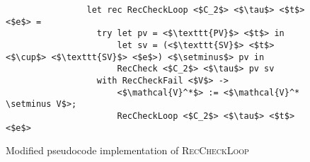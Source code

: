 \begin{figure}
\centering

\begin{verbatim}
                let rec RecCheckLoop <$C_2$> <$\tau$> <$t$> <$e$> =
                  try let pv = <$\texttt{PV}$> <$t$> in
                      let sv = (<$\texttt{SV}$> <$t$> <$\cup$> <$\texttt{SV}$> <$e$>) <$\setminus$> pv in
                      RecCheck <$C_2$> <$\tau$> pv sv
                  with RecCheckFail <$V$> ->
                      <$\mathcal{V}^*$> := <$\mathcal{V}^* \setminus V$>;
                      RecCheckLoop <$C_2$> <$\tau$> <$t$> <$e$>
\end{verbatim}

\caption{Modified pseudocode implementation of \textsc{RecCheckLoop}}
\label{fig:simpl-helpers}
\end{figure}
